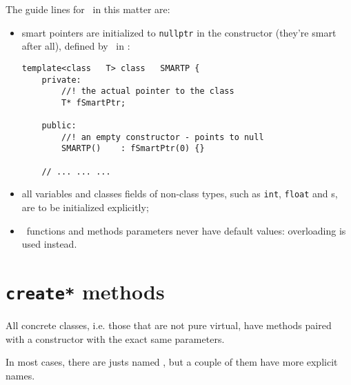 The guide lines for \mf\ in this matter are:
\begin{itemize}
\item smart pointers are initialized to {\tt nullptr} in the  constructor (they're smart after all), defined by \libmusicxml\ in :
\begin{lstlisting}[language=CPlusPlus]
template<class   T> class   SMARTP {
	private:
		//! the actual pointer to the class
		T* fSmartPtr;

	public:
		//! an empty constructor - points to null
		SMARTP()	: fSmartPtr(0) {}

	// ... ... ...
\end{lstlisting}

\item all variables and classes fields of non-class   types, such as {\tt int}, {\tt float} and \enumType s, are to be initialized explicitly;

\item \mf\ functions and methods parameters never have default values: overloading is used instead.
\end{itemize}


\section{{\tt create*} methods}%

All concrete classes, i.e. those that are not pure virtual, have  methods paired with a constructor with the exact same parameters.

In most cases, there are justs named , but a couple of them have more explicit names.

